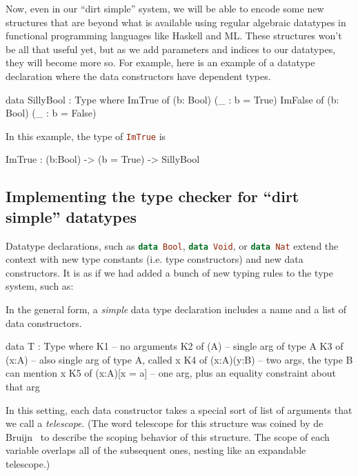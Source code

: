 \documentclass{article}
\newcommand\cd[1]{\lstinline[language=Haskell]{#1}}
\theoremstyle{definition}
\begin{document}
Now, even in our ``dirt simple'' system, we will be able to encode some new
structures that are beyond what is available using regular algebraic datatypes
in functional programming languages like Haskell and ML. These structures
won't be all that useful yet, but as we add parameters and indices to our
datatypes, they will become more so. For example, here is an example of a
datatype declaration where the data constructors have dependent types.

\begin{piforall}
data SillyBool : Type where
   ImTrue  of (b: Bool) (_ : b = True)
   ImFalse of (b: Bool) (_ : b = False)
\end{piforall}

In this example, the type of \cd{ImTrue} is
\begin{piforall}
ImTrue : (b:Bool) -> (b = True) -> SillyBool
\end{piforall}

\subsection{Implementing the type checker for ``dirt simple'' datatypes}

Datatype declarations, such as \cd{data Bool}, \cd{data Void},
or \cd{data Nat} extend the context with new type constants (i.e.
type constructors) and new data constructors. It is as if we had added a
bunch of new typing rules to the type system, such as:


In the general form, a \emph{simple} data type declaration includes a
name and a list of data constructors.

\begin{piforall}
   data T : Type where
      K1                 -- no arguments
      K2 of (A)          -- single arg of type A
      K3 of (x:A)        -- also single arg of type A, called x
      K4 of (x:A)(y:B)   -- two args, the type B can mention x
      K5 of (x:A)[x = a] -- one arg, plus an equality constraint about that arg
\end{piforall}

In this setting, each data constructor takes a special sort of list of
arguments that we call a \emph{telescope}. (The word telescope for this
structure was coined by de Bruijn~\cite{debruijn} to describe the scoping
behavior of this structure. The scope of each variable overlaps all of the
subsequent ones, nesting like an expandable telescope.)
\end{document}
